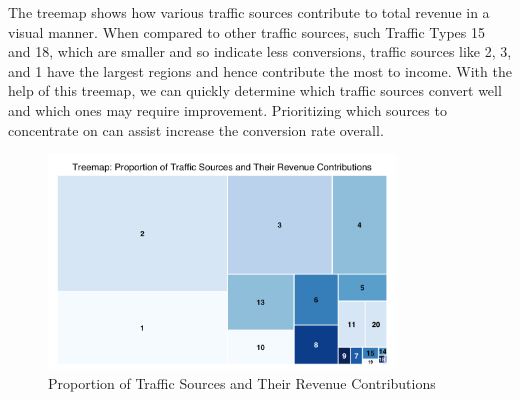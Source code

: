 \documentclass[12pt]{article}
\begin{document}
\FloatBarrier
The treemap shows how various traffic sources contribute to total revenue in a visual manner. When compared to other traffic sources, such Traffic Types 15 and 18, which are smaller and so indicate less conversions, traffic sources like 2, 3, and 1 have the largest regions and hence contribute the most to income. With the help of this treemap, we can quickly determine which traffic sources convert well and which ones may require improvement. Prioritizing which sources to concentrate on can assist increase the conversion rate overall.
\begin{figure}[h]
    \centering
    \includegraphics[width=0.82\textwidth]{Proportion of Traffic Sources and Their Revenue Contributions.png}  
    \caption{Proportion of Traffic Sources and Their Revenue Contributions}
\end{figure}
\vspace{0.5cm}
\end{document}
